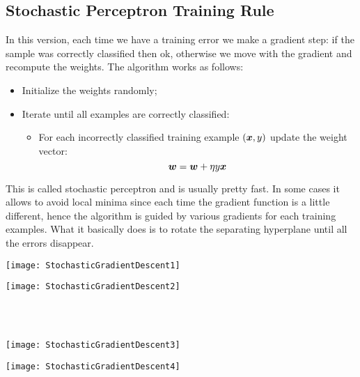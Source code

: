 \subsection{Stochastic Perceptron Training Rule}
In this version, each time we have a training error we make a gradient step: if the sample was correctly classified then ok, otherwise we move with the gradient and recompute the weights. The algorithm works as follows:
\begin{itemize}
  \item Initialize the weights randomly;
  \item Iterate until all examples are correctly classified:
    \begin{itemize}
      \item For each incorrectly classified training example $(\bm{x},y)$ update the weight vector:
        \[\bm{w}=\bm{w}+\eta y\bm{x}\]
    \end{itemize}
\end{itemize}
This is called stochastic perceptron and is usually pretty fast. In some cases it allows to avoid local minima since each time the gradient function is a little different, hence the algorithm is guided by various gradients for each training examples.\newline
What it basically does is to rotate the separating hyperplane until all the errors disappear.
\begin{center}
  \begin{minipage}{\linewidth}
    \begin{minipage}{0.48\linewidth}
      \texttt{[image: StochasticGradientDescent1]}
    \end{minipage}
    \hspace{0.02\linewidth}
    \begin{minipage}{0.48\linewidth}
      \texttt{[image: StochasticGradientDescent2]}
    \end{minipage}\\
    \vspace{0.1cm}\\
    \begin{minipage}{0.48\linewidth}
      \texttt{[image: StochasticGradientDescent3]}
    \end{minipage}
    \hspace{0.02\linewidth}
    \begin{minipage}{0.48\linewidth}
      \texttt{[image: StochasticGradientDescent4]}
    \end{minipage}
  \end{minipage}
\end{center}
%
%
%

